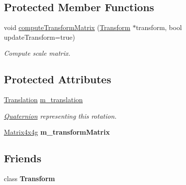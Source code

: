 \subsection*{Protected Member Functions}
\begin{DoxyCompactItemize}
\item 
\mbox{\label{classrev_1_1_translation_component_ad0fe6fa4a7bf574165d98c75d5428c79}} 
void \mbox{\hyperlink{classrev_1_1_translation_component_ad0fe6fa4a7bf574165d98c75d5428c79}{compute\+Transform\+Matrix}} (\mbox{\hyperlink{classrev_1_1_transform}{Transform}} $\ast$transform, bool update\+Transform=true)
\begin{DoxyCompactList}\small\item\em Compute scale matrix. \end{DoxyCompactList}\end{DoxyCompactItemize}
\subsection*{Protected Attributes}
\begin{DoxyCompactItemize}
\item 
\mbox{\label{classrev_1_1_translation_component_af30fedebb3172ed5834b2e67d802adaf}} 
\mbox{\hyperlink{structrev_1_1_translation}{Translation}} \mbox{\hyperlink{classrev_1_1_translation_component_af30fedebb3172ed5834b2e67d802adaf}{m\+\_\+translation}}
\begin{DoxyCompactList}\small\item\em \mbox{\hyperlink{classrev_1_1_quaternion}{Quaternion}} representing this rotation. \end{DoxyCompactList}\item 
\mbox{\label{classrev_1_1_translation_component_adc1c31608fb273904899e1f142805843}} 
\mbox{\hyperlink{classrev_1_1_square_matrix}{Matrix4x4g}} {\bfseries m\+\_\+transform\+Matrix}
\end{DoxyCompactItemize}
\subsection*{Friends}
\begin{DoxyCompactItemize}
\item 
\mbox{\label{classrev_1_1_translation_component_af851b4d9aacd1a871da33592334b8d72}} 
class {\bfseries Transform}
\end{DoxyCompactItemize}
